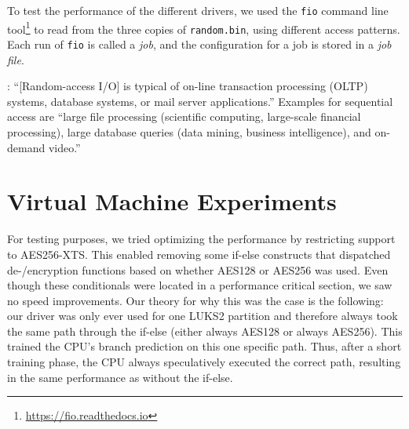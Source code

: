To test the performance of the different drivers, we used the \texttt{fio} command line tool\footnote{\label{fn:performance.setup.fio} \url{https://fio.readthedocs.io}} to read from the three copies of \texttt{random.bin}, using different access patterns. Each run of \texttt{fio} is called a \emph{job}, and the configuration for a job is stored in a \emph{job file}.






\cite{Traeger2008}: ``[Random-access I/O] is typical of on-line transaction processing (OLTP) systems, database systems, or mail server applications.'' Examples for sequential access are ``large file processing (scientific computing, large-scale financial processing), large database queries (data mining, business intelligence), and on-demand video.''

\section{Virtual Machine Experiments}
\label{chap:performance.vmexperiments}
 For testing purposes, we tried optimizing the performance by restricting support to AES256-XTS. This enabled removing some if-else constructs that dispatched de-/encryption functions based on whether AES128 or AES256 was used. Even though these conditionals were located in a performance critical section, we saw no speed improvements. Our theory for why this was the case is the following: our driver was only ever used for one LUKS2 partition and therefore always took the same path through the if-else (either always AES128 or always AES256). This trained the CPU's branch prediction on this one specific path. Thus, after a short training phase, the CPU always speculatively executed the correct path, resulting in the same performance as without the if-else.

